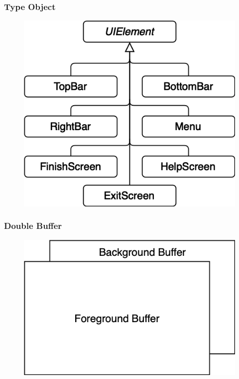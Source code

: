 \documentclass{beamer}
\begin{document}
\begin{frame}
    \frametitle{Type Object}
    \begin{figure}
        \includegraphics[scale=0.4]{resources/Typed_Objects_Diagram_UIElement_bb.png} 

    \end{figure}

\end{frame}

\begin{frame}
    \frametitle{Double Buffer}
    \begin{figure}
        \includegraphics[scale=0.4]{resources/Double_buffer.png} 

    \end{figure}

\end{frame}
\end{document}
